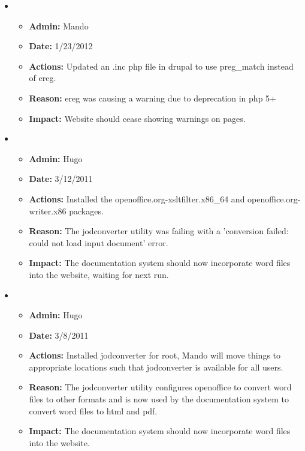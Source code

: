 \documentclass[12pt]{article}
\begin{document}
\begin{itemize}

\item 
\begin{itemize}
\item[] {\bf Admin:} Mando
\item[] {\bf Date:} 1/23/2012 
\item[] {\bf Actions:} Updated an .inc php file in drupal to use preg\_match instead of ereg.
\item[] {\bf Reason:} ereg was causing a warning due to deprecation in php 5+
\item[] {\bf Impact:} Website should cease showing warnings on pages.
\end{itemize}

\item 
\begin{itemize}
\item[] {\bf Admin:} Hugo
\item[] {\bf Date:} 3/12/2011 
\item[] {\bf Actions:} Installed the openoffice.org-xsltfilter.x86\_64
  and openoffice.org-writer.x86 packages.
\item[] {\bf Reason:} The jodconverter utility was failing with a
  'conversion failed: could not load input document' error.
\item[] {\bf Impact:} The documentation system should now incorporate
  word files into the website, waiting for next run.
\end{itemize}

\item 
\begin{itemize}
\item[] {\bf Admin:} Hugo
\item[] {\bf Date:} 3/8/2011 
\item[] {\bf Actions:} Installed jodconverter for root, Mando will move things to appropriate locations such that jodconverter is available for all users.
\item[] {\bf Reason:} The jodconverter utility configures openoffice to convert word files to other formats and is now used by the documentation system to convert word files to html and pdf.
\item[] {\bf Impact:} The documentation system should now incorporate word files into the website.
\end{itemize}


\end{itemize}
\end{document}
